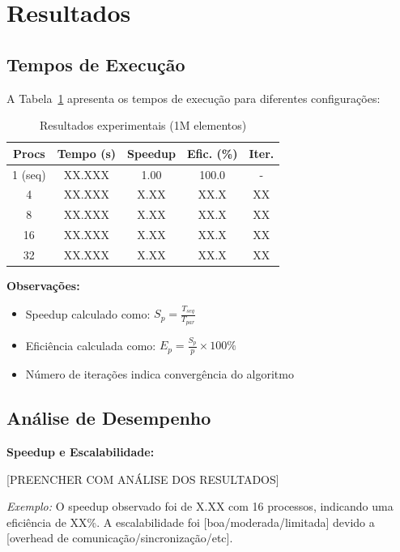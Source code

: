 \documentclass[10pt,twocolumn]{article}
\begin{document}
\section{Resultados}

\subsection{Tempos de Execução}

A Tabela~\ref{tab:results} apresenta os tempos de execução para diferentes configurações:

\begin{table}[h]
\centering
\small
\begin{tabular}{@{}ccccc@{}}
\toprule
\textbf{Procs} & \textbf{Tempo (s)} & \textbf{Speedup} & \textbf{Efic. (\%)} & \textbf{Iter.} \\
\midrule
1 (seq)  & XX.XXX & 1.00  & 100.0 & - \\
4        & XX.XXX & X.XX  & XX.X  & XX \\
8        & XX.XXX & X.XX  & XX.X  & XX \\
16       & XX.XXX & X.XX  & XX.X  & XX \\
32       & XX.XXX & X.XX  & XX.X  & XX \\
\bottomrule
\end{tabular}
\caption{Resultados experimentais (1M elementos)}
\label{tab:results}
\end{table}

\textbf{Observações:}
\begin{itemize}
    \item Speedup calculado como: $S_p = \frac{T_{seq}}{T_{par}}$
    \item Eficiência calculada como: $E_p = \frac{S_p}{p} \times 100\%$
    \item Número de iterações indica convergência do algoritmo
\end{itemize}

\subsection{Análise de Desempenho}

\textbf{Speedup e Escalabilidade:}

[PREENCHER COM ANÁLISE DOS RESULTADOS]

\textit{Exemplo:} O speedup observado foi de X.XX com 16 processos, indicando uma eficiência de XX\%. A escalabilidade foi [boa/moderada/limitada] devido a [overhead de comunicação/sincronização/etc].
\end{document}

